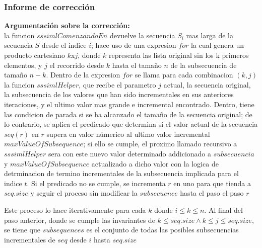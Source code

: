 \documentclass[12pt, a4paper]{article}
\begin{document}
\subsubsection{Informe de corrección}
\textbf{Argumentación sobre la corrección: \\}
la funcion $sssimlComenzandoEn$ devuelve la secuencia $S_i$ mas larga de la secuencia $S$ desde el 
    indice $i$; hace uso de una expresion $for$ la cual genera un producto cartesiano $k$x$j$, donde $k$ representa
    las lista original sin los k primeros elementos, y $j$ el recorrido desde $k$ hasta el tamaño $n$ de la subsecuencia de
    tamaño $n - k$. Dentro de la expresion $for$ se llama para cada combinacion $(k,j)$ la funcion $sssimlHelper$,
    que recibe el parametro $j$ actual, la secuencia original, la subsecuencia de los valores que han sido incrementales en sus anteriores iteraciones, y
    el ultimo valor mas grande e incremental encontrado. Dentro, tiene las condicion de parada si se ha alcanzado el tamaño de la 
    secuencia original; de lo contrario, se aplica el predicado que determina si el valor actual de la secuencia $seq(r)$ en $r$ supera en valor 
    númerico al ultimo valor incremental $maxValueOfSubsequence$; si ello se cumple, el proximo llamado recursivo a 
    $sssimlHelper$ sera con este nuevo valor determinado addicionado a $subsecuencia$ y $maxValueOfSubsequence$ actualizado a dicho valor 
con la logica de detrminacion de termino incrementales de la subsecuencia implicada para el indice $t$. Si el predicado no se cumple,
   se incrementa $r$ en uno para que tienda a $seq.size$ y seguir el proceso sin modificar la $subsecuence$ hasta el paso el paso $r$

   Este proceso lo hace iterativamente para cada $k$ donde $ i \leq k \leq n$.
   Al final del paso anterior, donde se cumple las invariantes de $ k \leq seq.size \land k \leq  j \leq seq.size$, se tiene 
   que $subsequences$ es el conjunto de todas las posibles subsecuencias incrementales de $seq$ desde  $i$ hasta $seq.size$
\end{document}
